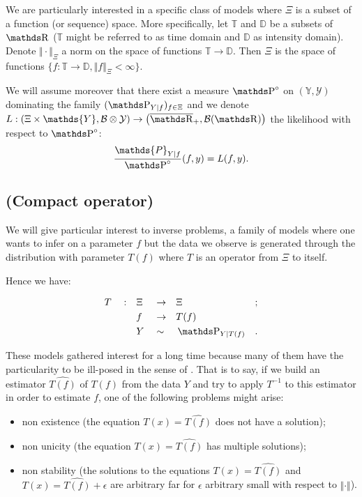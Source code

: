 \bigskip

We are particularly interested in a specific class of models where $\Xi$ is a subset of a function (or sequence) space.
More specifically, let $\mathds{T}$ and $\mathds{D}$ be a subsets of $\R$ ($\mathds{T}$ might be referred to as time domain and $\mathds{D}$ as intensity domain).
Denote $\Vert \cdot \Vert_{\Xi}$ a norm on the space of functions $\mathds{T} \rightarrow \mathds{D}$.
Then $\Xi$ is the space of functions $\{f : \mathds{T} \rightarrow \mathds{D}, \Vert f \Vert_{\Xi} < \infty\}$.

\bigskip

We will assume moreover that there exist a measure $\P^{\circ}$ on $(\mathds{Y}, \mathcal{Y})$ dominating the family $(\P_{Y \vert f})_{f \in \Xi}$ and we denote $L : \left(\Xi \times \mathds{Y}, \mathcal{B} \otimes \mathcal{Y}\right) \rightarrow \left(\overline{\R}_{+}, \mathcal{B}(\R)\right)$ the likelihood with respect to $\P^{\circ}$:
\[\frac{\mathds{P}_{Y \vert f}}{\P^{\circ}}(f, y) = L(f, y).\]

\subsection{(Compact operator)}\label{INTRO_INVERSE_COMPACTOPE}
We will give particular interest to inverse problems, a family of models where one wants to infer on a parameter $f$ but the data we observe is generated through the distribution with parameter $T(f)$ where $T$ is an operator from $\Xi$ to itself.

Hence we have:

\begin{alignat*}{6}
& T && : && \Xi && \rightarrow && \Xi && ; \\
& && && f && \rightarrow && T(f) && \\
& && && Y && \sim && \P_{Y \vert T(f)} &&.
\end{alignat*}

These models gathered interest for a long time because many of them have the particularity to be ill-posed in the sense of \citet{cite:hadamard}.
That is to say, if we build an estimator $\widehat{T(f)}$ of $T(f)$ from the data $Y$ and try to apply $T^{-1}$ to this estimator in order to estimate $f$, one of the following problems might arise:
\begin{itemize}
\item non existence (the equation $T(x) = \widehat{T(f)}$ does not have a solution);
\item non unicity (the equation $T(x) = \widehat{T(f)}$ has multiple solutions);
\item non stability (the solutions to the equations $T(x) = \widehat{T(f)}$ and $T(x) = \widehat{T(f)} + \epsilon$ are arbitrary far for $\epsilon$ arbitrary small with respect to $\Vert \cdot \Vert$).
\end{itemize}

